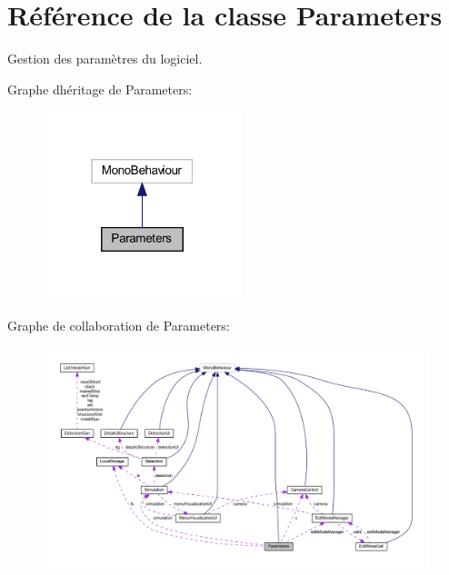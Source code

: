\hypertarget{class_parameters}{}\section{Référence de la classe Parameters}
\label{class_parameters}


Gestion des paramètres du logiciel.  




Graphe d\textquotesingle{}héritage de Parameters\+:\nopagebreak
\begin{figure}[H]
\begin{center}
\leavevmode
\includegraphics[width=163pt]{class_parameters__inherit__graph}
\end{center}
\end{figure}


Graphe de collaboration de Parameters\+:
\nopagebreak
\begin{figure}[H]
\begin{center}
\leavevmode
\includegraphics[width=350pt]{class_parameters__coll__graph}
\end{center}
\end{figure}
